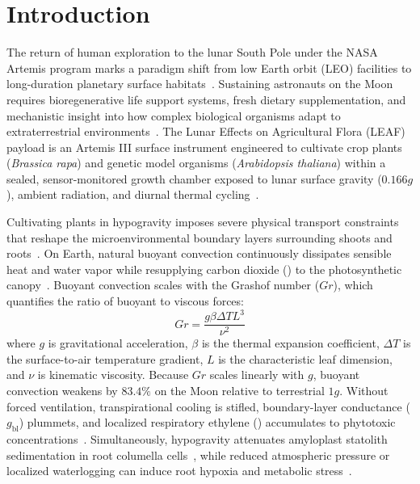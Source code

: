 \documentclass[10pt,twocolumn,twoside]{article}
\begin{document}
\section*{Introduction}

The return of human exploration to the lunar South Pole under the NASA Artemis program marks a paradigm shift from low Earth orbit (LEO) facilities to long-duration planetary surface habitats~\cite{jeseritz2025leaf,paul2013fundamental}. Sustaining astronauts on the Moon requires bioregenerative life support systems, fresh dietary supplementation, and mechanistic insight into how complex biological organisms adapt to extraterrestrial environments~\cite{massa2016plant,monje2020hardware,richards2006}. The Lunar Effects on Agricultural Flora (LEAF) payload is an Artemis III surface instrument engineered to cultivate crop plants (\textit{Brassica rapa}) and genetic model organisms (\textit{Arabidopsis thaliana}) within a sealed, sensor-monitored growth chamber exposed to lunar surface gravity ($0.166g$), ambient radiation, and diurnal thermal cycling~\cite{jeseritz2025leaf,zhang2020,george2024}.

Cultivating plants in hypogravity imposes severe physical transport constraints that reshape the microenvironmental boundary layers surrounding shoots and roots~\cite{porterfield2002biophysical,kitaya2001gravity}. On Earth, natural buoyant convection continuously dissipates sensible heat and water vapor while resupplying carbon dioxide () to the photosynthetic canopy~\cite{farquhar1980biochemical,kitaya2003air}. Buoyant convection scales with the Grashof number ($Gr$), which quantifies the ratio of buoyant to viscous forces:
\begin{equation}
Gr = \frac{g \beta \Delta T L^3}{\nu^2}
\label{eq:grashof}
\end{equation}
where $g$ is gravitational acceleration, $\beta$ is the thermal expansion coefficient, $\Delta T$ is the surface-to-air temperature gradient, $L$ is the characteristic leaf dimension, and $\nu$ is kinematic viscosity. Because $Gr$ scales linearly with $g$, buoyant convection weakens by $83.4\%$ on the Moon relative to terrestrial $1g$. Without forced ventilation, transpirational cooling is stifled, boundary-layer conductance ($g_{\mathrm{bl}}$) plummets, and localized respiratory ethylene () accumulates to phytotoxic concentrations~\cite{porterfield2002biophysical,kitaya2001gravity,wheeler1996}. Simultaneously, hypogravity attenuates amyloplast statolith sedimentation in root columella cells~\cite{canaday2026}, while reduced atmospheric pressure or localized waterlogging can induce root hypoxia and metabolic stress~\cite{park2016,zhou2017}.
\end{document}

